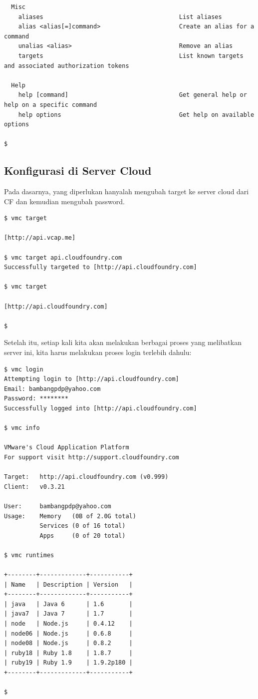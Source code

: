 \begin{lstlisting}
  Misc 
    aliases                                      List aliases 
    alias <alias[=]command>                      Create an alias for a command 
    unalias <alias>                              Remove an alias 
    targets                                      List known targets and associated authorization tokens 

  Help 
    help [command]                               Get general help or help on a specific command 
    help options                                 Get help on available options 

$ 
\end{lstlisting}

\subsection{Konfigurasi di Server Cloud}

Pada dasarnya, yang diperlukan hanyalah mengubah target ke server cloud dari CF dan kemudian mengubah password.

\lstset{language=bash,caption=Mengubah target server}
\begin{lstlisting}
$ vmc target 

[http://api.vcap.me] 

$ vmc target api.cloudfoundry.com 
Successfully targeted to [http://api.cloudfoundry.com] 

$ vmc target 
 
[http://api.cloudfoundry.com] 

$ 
\end{lstlisting}

Setelah itu, setiap kali kita akan melakukan berbagai proses yang melibatkan server ini, kita harus melakukan proses login terlebih dahulu:

\lstset{language=bash,caption=Login ke server}
\begin{lstlisting}
$ vmc login 
Attempting login to [http://api.cloudfoundry.com] 
Email: bambangpdp@yahoo.com 
Password: ******** 
Successfully logged into [http://api.cloudfoundry.com] 

$ vmc info 

VMware's Cloud Application Platform 
For support visit http://support.cloudfoundry.com 

Target:   http://api.cloudfoundry.com (v0.999) 
Client:   v0.3.21 

User:     bambangpdp@yahoo.com 
Usage:    Memory   (0B of 2.0G total) 
          Services (0 of 16 total) 
          Apps     (0 of 20 total) 

$ vmc runtimes 

+--------+-------------+-----------+ 
| Name   | Description | Version   | 
+--------+-------------+-----------+ 
| java   | Java 6      | 1.6       | 
| java7  | Java 7      | 1.7       | 
| node   | Node.js     | 0.4.12    | 
| node06 | Node.js     | 0.6.8     | 
| node08 | Node.js     | 0.8.2     | 
| ruby18 | Ruby 1.8    | 1.8.7     | 
| ruby19 | Ruby 1.9    | 1.9.2p180 | 
+--------+-------------+-----------+ 

$ 
\end{lstlisting}

